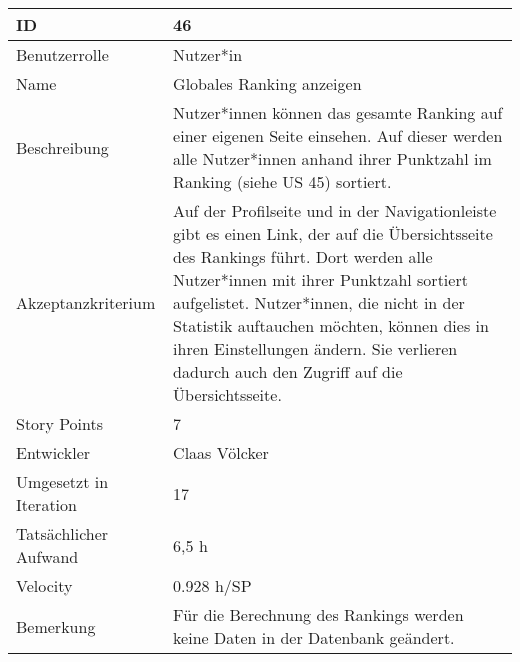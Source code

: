 \begin{tabularx}{\textwidth}{|p{}|X|}
	\hline
	ID & 46\\
	\hline
	Benutzerrolle & Nutzer*in\\
	\hline
	Name & Globales Ranking anzeigen\\
	\hline
	Beschreibung & Nutzer*innen können das gesamte Ranking auf einer eigenen Seite einsehen. Auf dieser werden alle Nutzer*innen anhand ihrer Punktzahl im Ranking (siehe US 45) sortiert.\\
	\hline
	Akzeptanzkriterium & Auf der Profilseite und in der Navigationleiste gibt es einen Link, der auf die Übersichtsseite des Rankings führt. Dort werden alle Nutzer*innen mit ihrer Punktzahl sortiert aufgelistet. Nutzer*innen, die nicht in der Statistik auftauchen möchten, können dies in ihren Einstellungen ändern. Sie verlieren dadurch auch den Zugriff auf die Übersichtsseite.\\
	\hline
	Story Points & 7\\
	\hline
	Entwickler & Claas Völcker\\
	\hline
	Umgesetzt in Iteration & 17\\
	\hline
	Tatsächlicher Aufwand & 6,5 h\\
	\hline
	Velocity & 0.928 h/SP\\
	\hline
	Bemerkung & Für die Berechnung des Rankings werden keine Daten in der Datenbank geändert.\\
	\hline
\end{tabularx}
\vspace{20pt}
